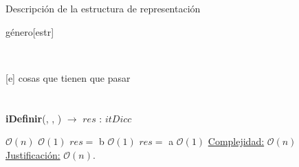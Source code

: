 \documentclass[10pt,a4paper]{article}
\begin{document}
\section{}
\begin{Representacion}
    
    Descripción de la estructura de representación
  
    \begin{Estructura}{género}[estr]%
      \begin{Tupla}[estr]%
      \end{Tupla}
    \end{Estructura}
  
  
    ~
  
    [e]{
        cosas que tienen que pasar}

\end{Representacion}

\section{}
\begin{Algoritmos}
    
    \begin{algorithm}[H]{\textbf{iDefinir}(, , ) $\to$ $res$ : $itDicc$}
        \begin{algorithmic}
             \Comment $\mathcal{O}(n)$
                 \Comment $\mathcal{O}(1)$
                    \State $res = $ b \Comment $\mathcal{O}(1)$
                \Else
                    \State $res = $ a \Comment $\mathcal{O}(1)$
                \EndIf
            \EndWhile
            \Statex \underline{Complejidad:} $\mathcal{O}(n)$
            \Statex \underline{Justificación:} $\mathcal{O}(n)$.
        \end{algorithmic}
        \end{algorithm}


\end{Algoritmos}

\end{document}
